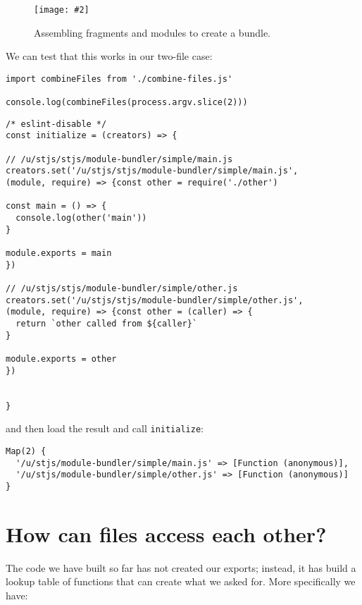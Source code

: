 \documentclass[krantzl]{krantz}
\newcommand{\figpdf}[4]{\begin{figure}%
\centering%
\texttt{[image: \#2]}%
\caption{#3}%
\label{#1}%
\end{figure}}
\begin{document}
\figpdf{module-bundler-head-tail}{./module-bundler/head-tail.pdf}{Assembling fragments and modules to create a bundle.}{0.6}


We can test that this works in our two-file case:


\begin{lstlisting}[frame=single,frameround=tttt]
import combineFiles from './combine-files.js'

console.log(combineFiles(process.argv.slice(2)))
\end{lstlisting}



\begin{lstlisting}[frame=single,frameround=tttt]
/* eslint-disable */
const initialize = (creators) => {

// /u/stjs/stjs/module-bundler/simple/main.js
creators.set('/u/stjs/stjs/module-bundler/simple/main.js',
(module, require) => {const other = require('./other')

const main = () => {
  console.log(other('main'))
}

module.exports = main
})

// /u/stjs/stjs/module-bundler/simple/other.js
creators.set('/u/stjs/stjs/module-bundler/simple/other.js',
(module, require) => {const other = (caller) => {
  return `other called from ${caller}`
}

module.exports = other
})


}
\end{lstlisting}



\noindent and then load the result and call \texttt{initialize}:


\begin{lstlisting}[frame=single,frameround=tttt]
Map(2) {
  '/u/stjs/module-bundler/simple/main.js' => [Function (anonymous)],
  '/u/stjs/module-bundler/simple/other.js' => [Function (anonymous)]
}
\end{lstlisting}


\section{How can files access each other?}\label{module-bundler-access}


The code we have built so far has not created our exports;
instead,
it has build a lookup table of functions that can create what we asked for.
More specifically we have:
\end{document}
